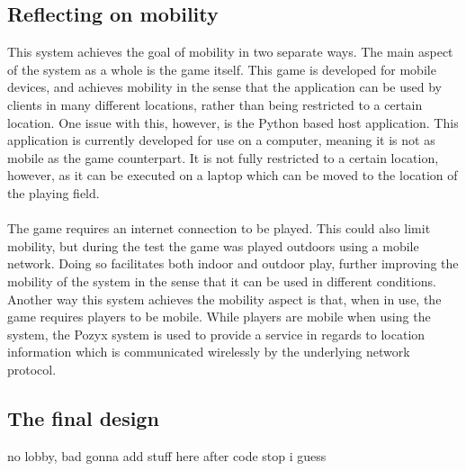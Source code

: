 \subsection{Reflecting on mobility}
This system achieves the goal of mobility in two separate ways.
The main aspect of the system as a whole is the game itself.
This game is developed for mobile devices, and achieves mobility in the sense that the application can be used by clients in many different locations, rather than being restricted to a certain location.
One issue with this, however, is the Python based host application.
This application is currently developed for use on a computer, meaning it is not as mobile as the game counterpart.
It is not fully restricted to a certain location, however, as it can be executed on a laptop which can be moved to the location of the playing field.
\\\\
The game requires an internet connection to be played.
This could also limit mobility, but during the test  the game was played outdoors using a mobile network.
Doing so facilitates both indoor and outdoor play, further improving the mobility of the system in the sense that it can be used in different conditions.
Another way this system achieves the mobility aspect is that, when in use, the game requires players to be mobile.
While players are mobile when using the system, the Pozyx system is used to provide a service in regards to location information which is communicated wirelessly by the underlying network protocol.

\subsection{The final design}
no lobby, bad
gonna add stuff here after code stop i guess

